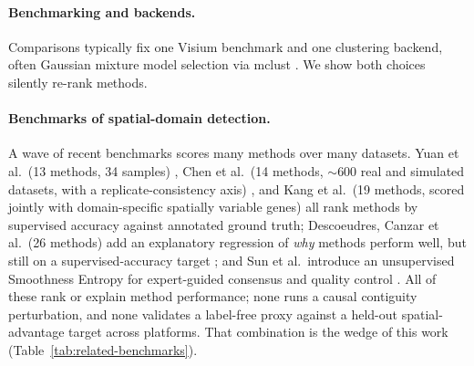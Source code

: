 \documentclass[journal]{IEEEtran}
\begin{document}
\paragraph{Benchmarking and backends.} Comparisons typically fix one Visium benchmark
\citep{maynard2021dlpfc} and one clustering backend, often Gaussian mixture model selection via mclust
\citep{scrucca2016mclust}. We show both choices silently re-rank methods.

\paragraph{Benchmarks of spatial-domain detection.} A wave of recent benchmarks scores many methods over many
datasets. Yuan et al.\ (13 methods, 34 samples) \citep{yuan2024benchmark}, Chen et al.\ (14 methods, $\sim$600
real and simulated datasets, with a replicate-consistency axis) \citep{chen2025imeta}, and Kang et al.\ (19
methods, scored jointly with domain-specific spatially variable genes) \citep{kang2025nar} all rank methods by
supervised accuracy against annotated ground truth; Descoeudres, Canzar et al.\ (26 methods) add an explanatory
regression of \emph{why} methods perform well, but still on a supervised-accuracy target
\citep{canzar2026biorxiv}; and Sun et al.\ introduce an unsupervised Smoothness Entropy for expert-guided
consensus and quality control \citep{sun2025smoothness}. All of these rank or explain method performance; none
runs a causal contiguity perturbation, and none validates a label-free proxy against a held-out
spatial-advantage target across platforms. That combination is the wedge of this work
(Table~\ref{tab:related-benchmarks}).
\end{document}
